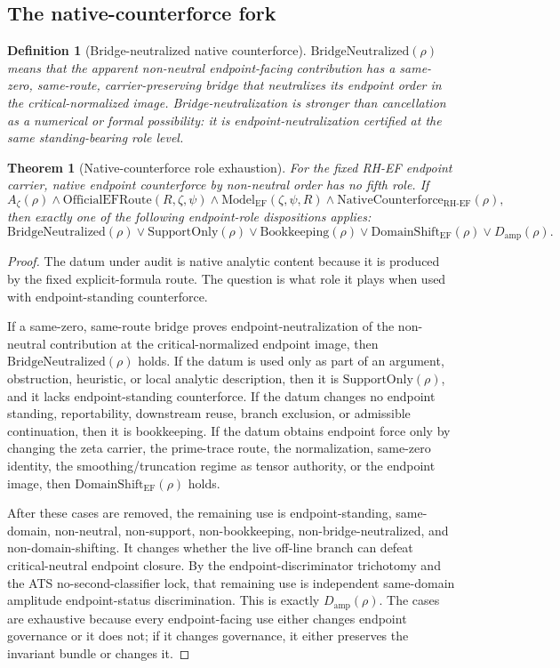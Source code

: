 \documentclass[11pt]{article}
\newtheorem{definition}{Definition}[section]
\newtheorem{theorem}{Theorem}[section]
\newcommand{\Az}{A_{\zeta}}
\newcommand{\RH}{\mathrm{RH}}
\newcommand{\EF}{\mathrm{EF}}
\newcommand{\ModelEF}{\mathrm{Model}_{\mathrm{EF}}}
\newcommand{\OfficialEFRoute}{\mathrm{OfficialEFRoute}}
\newcommand{\Damp}{D_{\mathrm{amp}}}
\newcommand{\Book}{\mathrm{Bookkeeping}}
\newcommand{\Support}{\mathrm{SupportOnly}}
\newcommand{\NativeCounterforce}{\mathrm{NativeCounterforce}}
\newcommand{\BridgeNeutralized}{\mathrm{BridgeNeutralized}}
\newcommand{\DomainShiftEF}{\mathrm{DomainShift}_{\mathrm{EF}}}
\begin{document}
\subsection{The native-counterforce fork}

\begin{definition}[Bridge-neutralized native counterforce]
\(\BridgeNeutralized(\rho)\) means that the apparent non-neutral endpoint-facing contribution has a same-zero, same-route, carrier-preserving bridge that neutralizes its endpoint order in the critical-normalized image.  Bridge-neutralization is stronger than cancellation as a numerical or formal possibility: it is endpoint-neutralization certified at the same standing-bearing role level.
\end{definition}

\begin{theorem}[Native-counterforce role exhaustion]
For the fixed RH-EF endpoint carrier, native endpoint counterforce by non-neutral order has no fifth role.  If
\[
\Az(\rho)\wedge \OfficialEFRoute(R,\zeta,\psi)\wedge \ModelEF(\zeta,\psi,R)
\wedge \NativeCounterforce_{\RH\text{-}\EF}(\rho),
\]
then exactly one of the following endpoint-role dispositions applies:
\[
\BridgeNeutralized(\rho)\vee \Support(\rho)\vee \Book(\rho)\vee \DomainShiftEF(\rho)\vee \Damp(\rho).
\]
\end{theorem}

\begin{proof}
The datum under audit is native analytic content because it is produced by the fixed explicit-formula route.  The question is what role it plays when used with endpoint-standing counterforce.

If a same-zero, same-route bridge proves endpoint-neutralization of the non-neutral contribution at the critical-normalized endpoint image, then \(\BridgeNeutralized(\rho)\) holds.  If the datum is used only as part of an argument, obstruction, heuristic, or local analytic description, then it is \(\Support(\rho)\), and it lacks endpoint-standing counterforce.  If the datum changes no endpoint standing, reportability, downstream reuse, branch exclusion, or admissible continuation, then it is bookkeeping.  If the datum obtains endpoint force only by changing the zeta carrier, the prime-trace route, the normalization, same-zero identity, the smoothing/truncation regime as tensor authority, or the endpoint image, then \(\DomainShiftEF(\rho)\) holds.

After these cases are removed, the remaining use is endpoint-standing, same-domain, non-neutral, non-support, non-bookkeeping, non-bridge-neutralized, and non-domain-shifting.  It changes whether the live off-line branch can defeat critical-neutral endpoint closure.  By the endpoint-discriminator trichotomy and the ATS no-second-classifier lock, that remaining use is independent same-domain amplitude endpoint-status discrimination.  This is exactly \(\Damp(\rho)\).  The cases are exhaustive because every endpoint-facing use either changes endpoint governance or it does not; if it changes governance, it either preserves the invariant bundle or changes it.
\end{proof}
\end{document}
